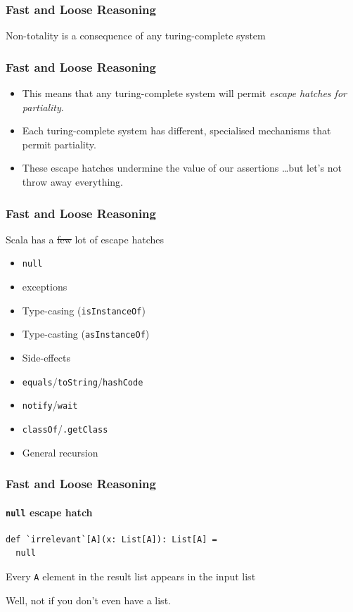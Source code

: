 \begin{frame}[fragile]
\frametitle{Fast and Loose Reasoning}
\begin{fact}Non-totality is a consequence of any turing-complete system\end{fact}
\end{frame}

\begin{frame}[fragile]
\frametitle{Fast and Loose Reasoning}
\begin{itemize}
  \item This means that any turing-complete system will permit \emph{escape hatches for partiality}.
  \item Each turing-complete system has different, specialised mechanisms that permit partiality.
  \item These escape hatches undermine the value of our assertions \ldots but let's not throw away everything.
\end{itemize}
\end{frame}

\begin{frame}[fragile]
\frametitle{Fast and Loose Reasoning}
\begin{block}{Scala has a \sout{few} lot of escape hatches}
\begin{itemize}
  \item \lstinline{null}
  \item exceptions
  \item Type-casing (\lstinline{isInstanceOf})
  \item Type-casting (\lstinline{asInstanceOf})
  \item Side-effects
  \item \lstinline{equals}/\lstinline{toString}/\lstinline{hashCode}
  \item \lstinline{notify}/\lstinline{wait}
  \item \lstinline{classOf}/\lstinline{.getClass}
  \item General recursion
\end{itemize}
\end{block}
\end{frame}

\begin{frame}[fragile]
\frametitle{Fast and Loose Reasoning}
\framesubtitle{\lstinline{null} escape hatch}
\begin{lstlisting}[style=scala]
def `irrelevant`[A](x: List[A]): List[A] = 
  null
\end{lstlisting}
\begin{theorem}Every \lstinline{A} element in the result list appears in the input list\end{theorem}
Well, not if you don't even have a list.
\end{frame}

